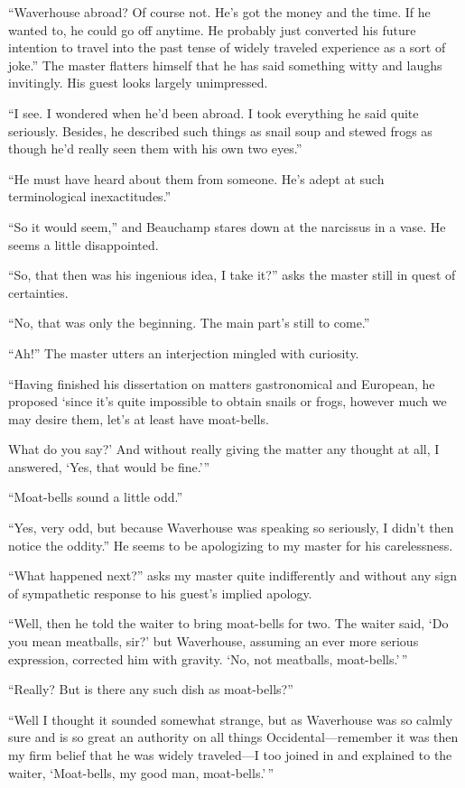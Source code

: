 \documentclass[12pt, openright]{book}
\begin{document}
``Waverhouse abroad? Of course not. He's got the money and the time. If
he wanted to, he could go off anytime. He probably just converted his
future intention to travel into the past tense of widely traveled
experience as a sort of joke.'' The master flatters himself that he has
said something witty and laughs invitingly. His guest looks largely
unimpressed.

``I see. I wondered when he'd been abroad. I took everything he said
quite seriously. Besides, he described such things as snail soup and
stewed frogs as though he'd really seen them with his own two eyes.''

``He must have heard about them from someone. He's adept at such
terminological inexactitudes.''

``So it would seem,'' and Beauchamp stares down at the narcissus in a
vase. He seems a little disappointed.

``So, that then was his ingenious idea, I take it?'' asks the master
still in quest of certainties.

``No, that was only the beginning. The main part's still to come.''

``Ah!'' The master utters an interjection mingled with curiosity.

``Having finished his dissertation on matters gastronomical and
European, he proposed `since it's quite impossible to obtain snails or
frogs, however much we may desire them, let's at least have moat-bells.

What do you say?' And without really giving the matter any thought at
all, I answered, `Yes, that would be fine.'''

``Moat-bells sound a little odd.''

``Yes, very odd, but because Waverhouse was speaking so seriously, I
didn't then notice the oddity.'' He seems to be apologizing to my master
for his carelessness.

``What happened next?'' asks my master quite indifferently and without
any sign of sympathetic response to his guest's implied apology.

``Well, then he told the waiter to bring moat-bells for two. The waiter
said, `Do you mean meatballs, sir?' but Waverhouse, assuming an ever
more serious expression, corrected him with gravity. `No, not meatballs,
moat-bells.'\,''

``Really? But is there any such dish as moat-bells?''

``Well I thought it sounded somewhat strange, but as Waverhouse was so
calmly sure and is so great an authority on all things
Occidental---remember it was then my firm belief that he was widely
traveled---I too joined in and explained to the waiter, `Moat-bells, my
good man, moat-bells.'\,''
\end{document}
